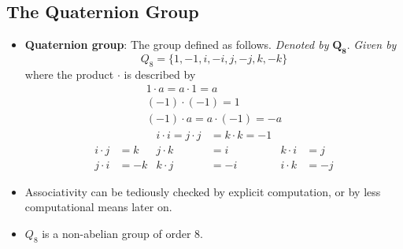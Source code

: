 \documentclass[../notes.tex]{subfiles}
\begin{document}
\subsection*{The Quaternion Group}
\begin{itemize}
    \item \textbf{Quaternion group}: The group defined as follows. \emph{Denoted by} $\bm{Q_8}$. \emph{Given by}
    \begin{equation*}
        Q_8 = \{1,-1,i,-i,j,-j,k,-k\}
    \end{equation*}
    where the product $\cdot$ is described by
    \begin{gather*}
        1\cdot a = a\cdot 1 = a\tag*{for all $a\in Q_8$}\\
        (-1)\cdot(-1) = 1\\
        (-1)\cdot a = a\cdot(-1) = -a\tag*{for all $a\in Q_8$}
    \end{gather*}
    \begin{align*}
        &&
            i\cdot i = j\cdot j &= k\cdot k = -1\\
        i\cdot j &= k&
            j\cdot k &= i&
                k\cdot i &= j\\
        j\cdot i &= -k&
            k\cdot j &= -i&
                i\cdot k &= -j
    \end{align*}
    \item Associativity can be tediously checked by explicit computation, or by less computational means later on.
    \item $Q_8$ is a non-abelian group of order 8.
\end{itemize}
\end{document}
